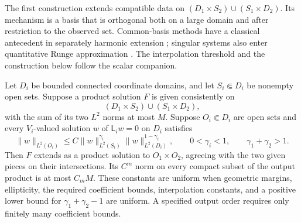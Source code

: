 The first construction extends compatible data on
$(D_1\times S_2)\cup(S_1\times D_2)$.  Its mechanism is a basis that is
orthogonal both on a large domain and after restriction to the observed
set.  Common-basis methods have a classical antecedent in separately
harmonic extension \cite{Zeriahi1982}; singular systems also enter
quantitative Runge approximation \cite{RulandSalo2019}.  The interpolation
threshold and the construction below follow the scalar companion.

\begin{lemma}\label{cross:series}
Let $D_i$ be bounded connected coordinate domains, and let
$S_i\Subset D_i$ be nonempty open sets.  Suppose a product solution $F$
is given consistently on
\[
 (D_1\times S_2)\cup(S_1\times D_2),
\]
with the sum of its two $L^2$ norms at most $M$.  Suppose
$O_i\Subset D_i$ are open sets and every $V_i$-valued solution $w$ of
$\mathsf L_iw=0$ on $D_i$ satisfies
\begin{equation}\label{cross:interpolation-input}
 \|w\|_{L^2(O_i)}
 \le C\|w\|_{L^2(S_i)}^{\gamma_i}
          \|w\|_{L^2(D_i)}^{1-\gamma_i},
 \qquad 0<\gamma_i<1,\qquad \gamma_1+\gamma_2>1.
\end{equation}
Then $F$ extends as a product solution to $O_1\times O_2$, agreeing with
the two given pieces on their intersections.  Its $C^m$ norm on every
compact subset of the output product is at most $C_mM$.
These constants are uniform when geometric margins, ellipticity, the
required coefficient bounds, interpolation constants, and a positive
lower bound for $\gamma_1+\gamma_2-1$ are uniform.  A specified output
order requires only finitely many coefficient bounds.
\end{lemma}

